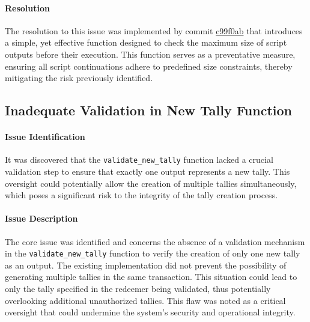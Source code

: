 \documentclass[11pt]{article}
\begin{document}
\paragraph{Resolution}
The resolution to this issue was implemented by commit \href{https://github.com/MuesliSwapTeam/muesliswap-atala-onchain-governance/commit/c99f0ab3f2e5a68499d4f137a53670ddee71510b}{c99f0ab} that introduces a simple, yet effective function designed to check the maximum size of script outputs before their execution. This function serves as a preventative measure, ensuring all script continuations adhere to predefined size constraints, thereby mitigating the risk previously identified.


\subsection{Inadequate Validation in New Tally Function}

\paragraph{Issue Identification}
It was discovered that the \texttt{validate\_new\_tally} function lacked a crucial validation step to ensure that exactly one output represents a new tally.
This oversight could potentially allow the creation of multiple tallies simultaneously, which poses a significant risk to the integrity of the tally creation process.

\paragraph{Issue Description}
The core issue was identified and concerns the absence of a validation mechanism in the \texttt{validate\_new\_tally} function to verify the creation of only one new tally as an output.
The existing implementation did not prevent the possibility of generating multiple tallies in the same transaction.
This situation could lead to only the tally specified in the redeemer being validated, thus potentially overlooking additional unauthorized tallies.
This flaw was noted as a critical oversight that could undermine the system's security and operational integrity.
\end{document}
